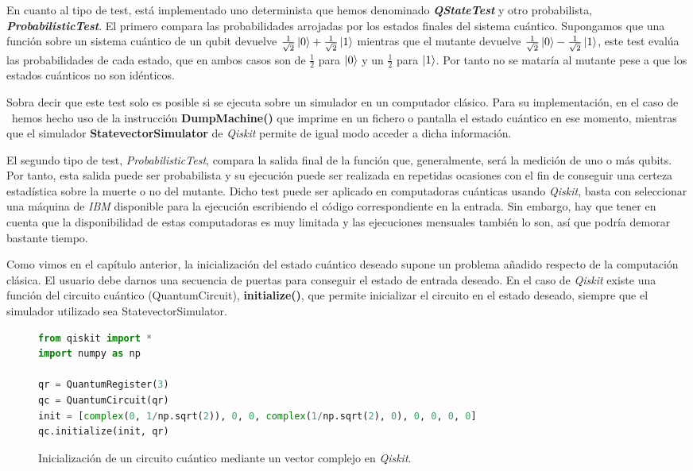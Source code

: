 En cuanto al tipo de test, está implementado uno determinista que hemos denominado \textbf{\textit{QStateTest}} y otro probabilista, \textbf{\textit{ProbabilisticTest}}. El primero compara las probabilidades arrojadas por los estados finales del sistema cuántico. Supongamos que una función sobre un sistema cuántico de un qubit devuelve $\frac{1}{\sqrt{2}}\left|0\right\rangle+\frac{1}{\sqrt{2}}\left|1\right\rangle$ mientras que el mutante devuelve $\frac{1}{\sqrt{2}}\left|0\right\rangle-\frac{1}{\sqrt{2}}\left|1\right\rangle$, este test evalúa las probabilidades de cada estado, que en ambos casos son de $\frac{1}{2}$ para $\left|0\right\rangle$ y un $\frac{1}{2}$ para $\left|1\right\rangle$. Por tanto no se mataría al mutante pese a que los estados cuánticos no son idénticos.

Sobra decir que este test solo es posible si se ejecuta sobre un simulador en un computador clásico. Para su implementación, en el caso de \qsh\ hemos hecho uso de la instrucción \textbf{DumpMachine()} que imprime en un fichero o pantalla el estado cuántico en ese momento, mientras que el simulador \textbf{StatevectorSimulator} de \textit{Qiskit} permite de igual modo acceder a dicha información.

El segundo tipo de test, \textit{ProbabilisticTest}, compara la salida final de la función que, generalmente, será la medición de uno o más qubits. Por tanto, esta salida puede ser probabilista y su ejecución puede ser realizada en repetidas ocasiones con el fin de conseguir una certeza estadística sobre la muerte o no del mutante. Dicho test puede ser aplicado en computadoras cuánticas usando \textit{Qiskit}, basta con seleccionar una máquina de \textit{IBM} disponible para la ejecución escribiendo el código correspondiente en la entrada. Sin embargo, hay que tener en cuenta que la disponibilidad de estas computadoras es muy limitada y las ejecuciones mensuales también lo son, así que podría demorar bastante tiempo.

Como vimos en el capítulo anterior, la inicialización del estado cuántico deseado supone un problema añadido respecto de la computación clásica. El usuario debe darnos una secuencia de puertas para conseguir el estado de entrada deseado. En el caso de \textit{Qiskit} existe una función del circuito cuántico (QuantumCircuit), \textbf{initialize()}, que permite inicializar el circuito en el estado deseado, siempre que el simulador utilizado sea StatevectorSimulator.

\begin{figure}[htb]
\begin{lstlisting}[language=Python]
from qiskit import *
import numpy as np

qr = QuantumRegister(3)
qc = QuantumCircuit(qr)
init = [complex(0, 1/np.sqrt(2)), 0, 0, complex(1/np.sqrt(2), 0), 0, 0, 0, 0]
qc.initialize(init, qr)
\end{lstlisting}
\caption{Inicialización de un circuito cuántico mediante un vector complejo en \textit{Qiskit}.}
\label{fig:code2}
\end{figure}

